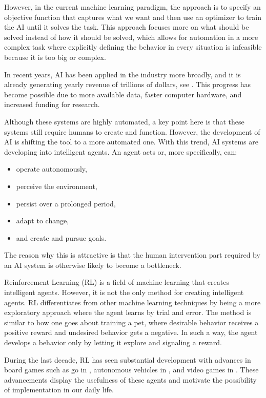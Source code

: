 \documentclass[12pt,A4]{report}
\theoremstyle{definition}
\begin{document}
However, in the current machine learning paradigm, the approach is to specify an objective function that captures what we want and then use an optimizer to train the AI until it solves the task. This approach focuses more on what should be solved instead of how it should be solved, which allows for automation in a more complex task where explicitly defining the behavior in every situation is infeasible because it is too big or complex. 

In recent years, AI has been applied in the industry more broadly, and it is already generating yearly revenue of trillions of dollars, see \citet[p.19]{RussellNorvig}. This progress has become possible due to more available data, faster computer hardware, and increased funding for research. 

Although these systems are highly automated, a key point here is that these systems still require humans to create and function. However, the development of AI is shifting the tool to a more automated one. With this trend, AI systems are developing into intelligent agents. An agent acts or, more specifically, can:
\begin{itemize}
  \item operate autonomously,
  \item perceive the environment,
  \item persist over a prolonged period,
  \item adapt to change,
  \item and create and pursue goals.
\end{itemize}
The reason why this is attractive is that the human intervention part required by an AI system is otherwise likely to become a bottleneck.

Reinforcement Learning (RL) is a field of machine learning that creates intelligent agents. However, it is not the only method for creating intelligent agents. RL differentiates from other machine learning techniques by being a more exploratory approach where the agent learns by trial and error. The method is similar to how one goes about training a pet, where desirable behavior receives a positive reward and undesired behavior gets a negative. In such a way, the agent develops a behavior only by letting it explore and signaling a reward. 

During the last decade, RL has seen substantial development with advances in board games such as go in \citet{Silver}, autonomous vehicles in \citet{Levinson}, and video games in \citet{Minh}. These advancements display the usefulness of these agents and motivate the possibility of implementation in our daily life. 
\end{document}
